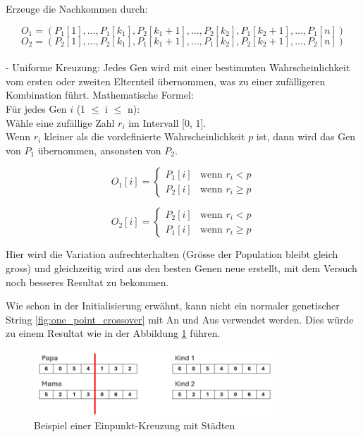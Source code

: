 Erzeuge die Nachkommen durch: \begin{refsection}
\[
O_1 = (P_1[1], \ldots, P_1[k_1], P_2[k_1+1], \ldots, P_2[k_2], P_1[k_2+1], \ldots, P_1[n])
\]
\[
O_2 = (P_2[1], \ldots, P_2[k_1], P_1[k_1+1], \ldots, P_1[k_2], P_2[k_2+1], \ldots, P_2[n])
\]
\\
- Uniforme Kreuzung: Jedes Gen wird mit einer bestimmten 
Wahrscheinlichkeit vom ersten oder zweiten Elternteil 
übernommen, was zu einer zufälligeren Kombination führt.
Mathematische Formel:\\
Für jedes Gen \( i \) (1 \(\leq\) i \(\leq\) n):\\
Wähle eine zufällige Zahl \( r_i \) im Intervall [0, 1].\\
Wenn \( r_i \) kleiner als die vordefinierte Wahrscheinlichkeit 
\( p \) ist, dann wird das Gen von \( P_1 \) übernommen, 
ansonsten von \( P_2 \).

\[ O_1[i] =
	\begin{cases} 
		P_1[i] & \text{wenn } r_i < p      \\
		P_2[i] & \text{wenn } r_i \geq p 
	\end{cases} \]

\[ O_2[i] =
	\begin{cases} 
		P_2[i] & \text{wenn } r_i < p      \\
		P_1[i] & \text{wenn } r_i \geq p 
	\end{cases} \]

Hier wird die Variation aufrechterhalten (Grösse der Population
bleibt gleich gross) und gleichzeitig wird aus den besten Genen 
neue erstellt, mit dem Versuch noch besseres Resultat zu bekommen.

Wie schon in der Initialisierung erwähnt, kann nicht ein normaler 
genetischer String \ref{fig:one_point_crossover} mit An und 
Aus verwendet werden. Dies würde zu einem Resultat wie in der Abbildung 
\ref{fig:one_point_crossover_cities} führen.

\begin{figure} [h]
	\centering
	\includegraphics[width=0.8\textwidth]{
		papers/variationsprinzip_algorithmen/images/teil3/07_genetic_string_cities_crossover_standard.png
	}
	\caption{Beispiel einer Einpunkt-Kreuzung mit Städten}
	\label{fig:one_point_crossover_cities}
\end{figure}


\end{refsection}
